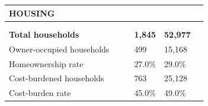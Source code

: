 \documentclass[9pt]{report}
\begin{document}
\vspace{12pt}
\setlength{\tabcolsep}{.01in} %
\begin{tabular}{p{.10in}p{.10in}p{.10in}p{3.7in}>{\hfill}p{.85in}>{\hfill}p{.85in}>{\hfill}p{.85in}>{\hfill}p{.85in}p{0.1in}}
\multicolumn{9}{l}{\parbox{7.1in}{\raggedright{\large{\strut\textbf{HOUSING}\strut}}}} \\ 
\hline
\multicolumn{4}{l}{\parbox{3.5in}{\raggedright{\textbf{}}}} & \multicolumn{1}{r}{\parbox{.85in}{\strut\raggedleft{\textbf{}\strut}}} & \multicolumn{1}{r}{\parbox{.85in}{\strut\raggedleft{\textbf{}\strut}}} & \multicolumn{1}{r}{\parbox{.85in}{\strut{}}} & \multicolumn{1}{r}{\parbox{.85in}{\strut{}}} & \\ 
\multicolumn{9}{l}{} \\ 
\multicolumn{4}{l}{\parbox{3.5in}{\strut\raggedright{\textbf{Total households}\strut}}} & \textbf{} & \textbf{} & \textbf{1,845} & \textbf{52,977} & \textbf{} \\ 
\multicolumn{4}{l}{\parbox{3.6in}{\strut\raggedright{{Owner-occupied households}}\strut}} &  &  & 499 & 15,168 & \multicolumn{1}{l}{}  \\ 
\multicolumn{4}{l}{\parbox{3.6in}{\strut\raggedright{{Homeownership rate}}\strut}} &  &  & 27.0\% & 29.0\% & \multicolumn{1}{l}{}  \\ 
\multicolumn{4}{l}{\parbox{3.6in}{\strut\raggedright{{Cost-burdened households}}\strut}} &  &  & 763 & 25,128 & \multicolumn{1}{l}{}  \\ 
\multicolumn{4}{l}{\parbox{3.6in}{\strut\raggedright{{Cost-burden rate}}\strut}} &  &  & 45.0\% & 49.0\% & \multicolumn{1}{l}{}  \\ 

\end{tabular}
\setlength{\tabcolsep}{6pt} %
\end{document}

